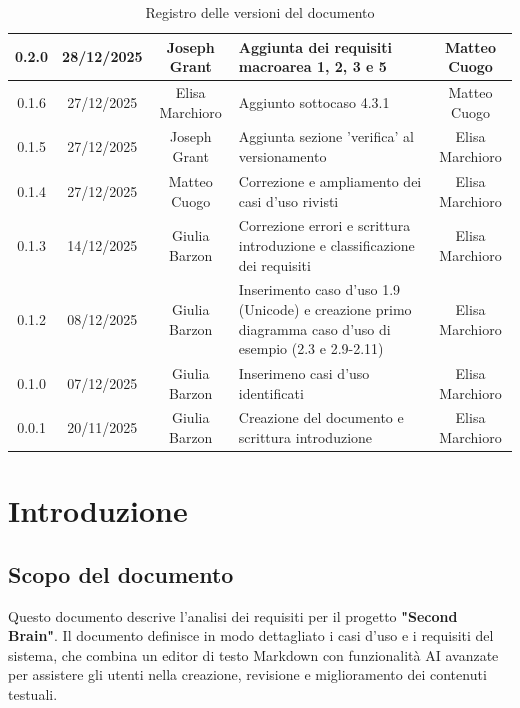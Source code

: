 \documentclass[11pt,a4paper]{article}
\begin{document}
\begin{table}[H]
\begin{tabular}{|c|c|c|>{\raggedright\arraybackslash}p{}|c|}
        \hline
        0.2.0 & 28/12/2025 & Joseph Grant & Aggiunta dei requisiti macroarea 1, 2, 3 e 5 &  Matteo Cuogo\\ 
        \hline
        0.1.6 & 27/12/2025 & Elisa Marchioro & Aggiunto sottocaso 4.3.1 & Matteo Cuogo\\ 
        \hline
        0.1.5 & 27/12/2025 & Joseph Grant & Aggiunta sezione 'verifica' al versionamento & Elisa Marchioro\\ 
        \hline
        0.1.4 & 27/12/2025 & Matteo Cuogo & Correzione e ampliamento dei casi d'uso rivisti & Elisa Marchioro\\
        \hline
        0.1.3 & 14/12/2025 & Giulia Barzon & Correzione errori e scrittura introduzione e classificazione dei requisiti & Elisa Marchioro\\
        \hline
        0.1.2 & 08/12/2025 & Giulia Barzon & Inserimento caso d'uso 1.9 (Unicode) e creazione primo diagramma caso d'uso di esempio (2.3 e 2.9-2.11) & Elisa Marchioro\\
        \hline
        0.1.0 & 07/12/2025 & Giulia Barzon & Inserimeno casi d'uso identificati & Elisa Marchioro\\
        \hline
        0.0.1 & 20/11/2025 & Giulia Barzon & Creazione del documento e scrittura introduzione & Elisa Marchioro\\
        \hline
    \end{tabular}
    \caption{Registro delle versioni del documento}
    \label{tab:versionamento}
\end{table}

\newpage

\tableofcontents
\thispagestyle{empty}
\newpage

\setcounter{page}{1}

\section{Introduzione}
\subsection{Scopo del documento}
Questo documento descrive l'analisi dei requisiti per il progetto \textbf{"Second Brain"}. Il documento definisce in modo dettagliato i casi d'uso e i requisiti del sistema, che combina un editor di testo Markdown con funzionalità AI avanzate per assistere gli utenti nella creazione, revisione e miglioramento dei contenuti testuali.
\end{document}

